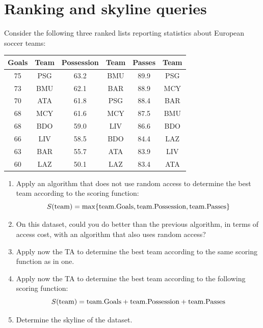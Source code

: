 \documentclass[12pt, a4paper]{report}
\begin{document}
    \section{Ranking and skyline queries}
        Consider the following three ranked lists reporting statistics about European soccer teams: 
        \begin{table}[H]
            \centering
            \begin{tabular}{|cc|cc|cc|}
            \hline
            \textbf{Goals} & \textbf{Team} & \textbf{Possession} & \textbf{Team} & \textbf{Passes} & \textbf{Team} \\ \hline
            75         & PSG      & 63.2         & BMU      & 89.9         & PSG      \\
            73         & BMU      & 62.1         & BAR      & 88.9         & MCY      \\
            70         & ATA      & 61.8         & PSG      & 88.4         & BAR      \\
            68         & MCY      & 61.6         & MCY      & 87.5         & BMU      \\
            68         & BDO      & 59.0         & LIV      & 86.6         & BDO      \\
            66         & LIV      & 58.5         & BDO      & 84.4         & LAZ      \\
            63         & BAR      & 55.7         & ATA      & 83.9         & LIV      \\
            60         & LAZ      & 50.1         & LAZ      & 83.4         & ATA      \\ \hline
            \end{tabular}
        \end{table}
        \begin{enumerate}
            \item Apply an algorithm that does not use random access to determine the best team according to the scoring function:
                \[S(\textnormal{team})=\max\{\textnormal{team.Goals},\textnormal{team.Possession},\textnormal{team.Passes}\}\]
            \item On this dataset, could you do better than the previous algorithm, in terms of access cost, with an algorithm that also uses random access? 
            \item Apply now the TA to determine the best team according to the same scoring function as in one. 
            \item Apply now the TA to determine the best team according to the following scoring function:
                \[S(\textnormal{team}) = \textnormal{team.Goals} + \textnormal{team.Possession} + \textnormal{team.Passes}\]
            \item Determine the skyline of the dataset. 
        \end{enumerate}
\end{document}
